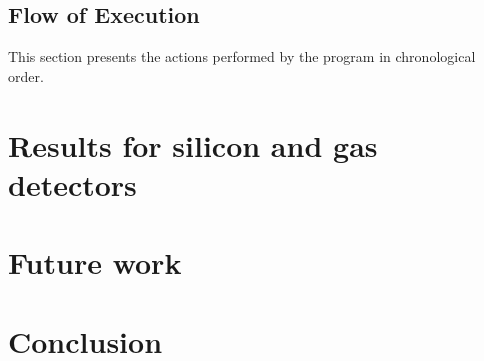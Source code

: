 \documentclass[11pt]{article}
\begin{document}
\subsection{Flow of Execution}

This section presents the actions performed by the program in chronological
order.




\section{Results for silicon and gas detectors}

\section{Future work}

\section{Conclusion}

\newpage



\end{document}
